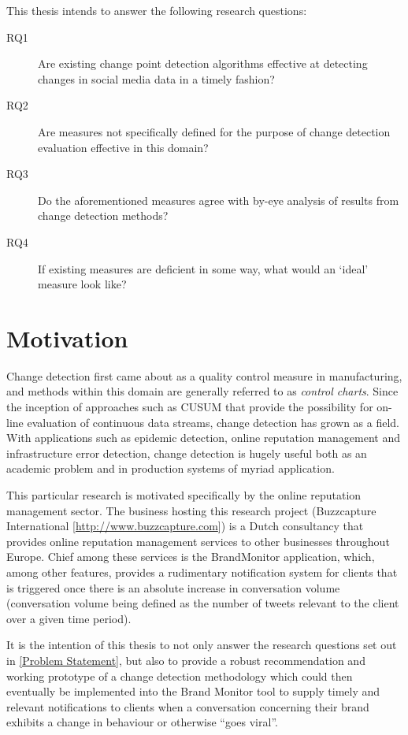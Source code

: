 \documentclass{uvamscse}	%
\begin{document}
This thesis intends to answer the following research questions:

\begin{description}
	\item[RQ1] Are existing change point detection algorithms effective at detecting changes in social media data in a timely fashion?
	\item[RQ2] Are measures not specifically defined for the purpose of change detection evaluation effective in this domain?
	\item[RQ3] Do the aforementioned measures agree with by-eye analysis of results from change detection methods?
	\item[RQ4] If existing measures are deficient in some way, what would an `ideal' measure look like?
\end{description}


\section{Motivation}

Change detection first came about as a quality control measure in manufacturing, and methods within this domain are generally referred to as \emph{control charts}. Since the inception of approaches such as CUSUM that provide the possibility for on-line evaluation of continuous data streams, change detection has grown as a field. With applications such as epidemic detection, online reputation management and infrastructure error detection, change detection is hugely useful both as an academic problem and in production systems of myriad application.

This particular research is motivated specifically by the online reputation management sector. The business hosting this research project (Buzzcapture International [\url{http://www.buzzcapture.com}]) is a Dutch consultancy that provides online reputation management services to other businesses throughout Europe. Chief among these services is the BrandMonitor application, which, among other features, provides a rudimentary notification system for clients that is triggered once there is an absolute increase in conversation volume (conversation volume being defined as the number of tweets relevant to the client over a given time period).

It is the intention of this thesis to not only answer the research questions set out in \autoref{Problem Statement}, but also to provide a robust recommendation and working prototype of a change detection methodology which could then eventually be implemented into the Brand Monitor tool to supply timely and relevant notifications to clients when a conversation concerning their brand exhibits a change in behaviour or otherwise ``goes viral''.
\end{document}

